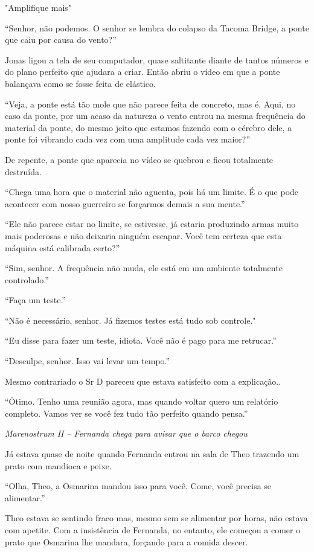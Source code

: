"Amplifique mais"

``Senhor, não podemos. O senhor se lembra do colapso da Tacoma Bridge, a
ponte que caiu por causa do vento?''

Jonas ligou a tela de seu computador, quase saltitante diante de tantos
números e do plano perfeito que ajudara a criar. Então abriu o vídeo em
que a ponte balançava como se fosse feita de elástico.

``Veja, a ponte está tão mole que não parece feita de concreto, mas é.
Aqui, no caso da ponte, por um acaso da natureza o vento entrou na mesma
frequência do material da ponte, do mesmo jeito que estamos fazendo com
o cérebro dele, a ponte foi vibrando cada vez com uma amplitude cada vez
maior?''

De repente, a ponte que aparecia no vídeo se quebrou e ficou totalmente
destruída.

``Chega uma hora que o material não aguenta, pois há um limite. É o que
pode acontecer com nosso guerreiro se forçarmos demais a sua mente.''

``Ele não parece estar no limite, se estivesse, já estaria produzindo
armas muito mais poderosas e não deixaria ninguém escapar. Você tem
certeza que esta máquina está calibrada certo?''

``Sim, senhor. A frequência não muda, ele está em um ambiente totalmente
controlado.''

``Faça um teste.''

``Não é necessário, senhor. Já fizemos testes está tudo sob controle."

``Eu disse para fazer um teste, idiota. Você não é pago para me
retrucar.''

``Desculpe, senhor. Isso vai levar um tempo.''

Mesmo contrariado o Sr D pareceu que estava satisfeito com a
explicação..

``Ótimo. Tenho uma reunião agora, mas quando voltar quero um relatório
completo. Vamos ver se você fez tudo tão perfeito quando pensa.''

\asterisc

\emph{Marenostrum II -- Fernanda chega para avisar que o barco chegou}

Já estava quase de noite quando Fernanda entrou na sala de Theo trazendo
um prato com mandioca e peixe.

``Olha, Theo, a Osmarina mandou isso para você. Come, você precisa se
alimentar.''

Theo estava se sentindo fraco mas, mesmo sem se alimentar por horas, não
estava com apetite. Com a insistência de Fernanda, no entanto, ele
começou a comer o prato que Osmarina lhe mandara, forçando para a comida
descer.

